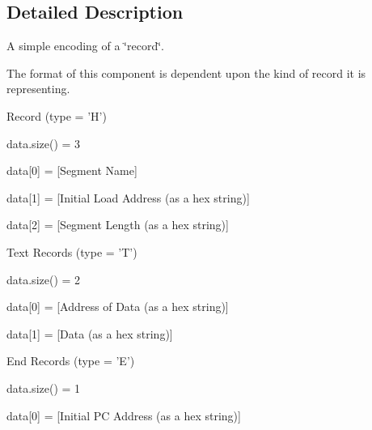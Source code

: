 \subsection{Detailed Description}
A simple encoding of a \char`\"{}record\char`\"{}. \begin{DoxyParagraph}{}
The format of this component is dependent upon the kind of record it is representing. 
\end{DoxyParagraph}
\begin{DoxyParagraph}{}
Record (type = 'H') 
\begin{DoxyItemize}
\item data.size() = 3 
\item 
\begin{DoxyItemize}
\item data\mbox{[}0\mbox{]} = \mbox{[}Segment Name\mbox{]} 
\item data\mbox{[}1\mbox{]} = \mbox{[}Initial Load Address (as a hex string)\mbox{]} 
\item data\mbox{[}2\mbox{]} = \mbox{[}Segment Length (as a hex string)\mbox{]}
\end{DoxyItemize}
\end{DoxyItemize}\begin{DoxyItemize}
\item Text Records (type = 'T') 
\begin{DoxyItemize}
\item data.size() = 2 
\item 
\begin{DoxyItemize}
\item data\mbox{[}0\mbox{]} = \mbox{[}Address of Data (as a hex string)\mbox{]} 
\item data\mbox{[}1\mbox{]} = \mbox{[}Data (as a hex string)\mbox{]}  
\end{DoxyItemize}
\item End Records (type = 'E') 
\begin{DoxyItemize}
\item data.size() = 1 
\item 
\begin{DoxyItemize}
\item data\mbox{[}0\mbox{]} = \mbox{[}Initial PC Address (as a hex string)\mbox{]}
\end{DoxyItemize}
\end{DoxyItemize}
\end{DoxyItemize}\end{DoxyItemize}

\end{DoxyParagraph}
